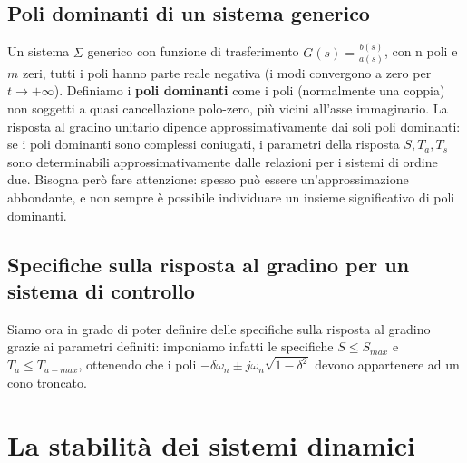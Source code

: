 \documentclass[11pt]{article}
\begin{document}
\subsection{Poli dominanti di un sistema generico}
Un sistema $\Sigma$ generico con funzione di trasferimento $G(s)=\frac{b(s)}{a(s)}$, con n poli e $m$ zeri, tutti i poli hanno parte reale negativa (i modi convergono a zero per $t\rightarrow+\infty$). Definiamo i \textbf{poli dominanti} come i poli (normalmente una coppia) non soggetti a quasi cancellazione polo-zero, più vicini all'asse immaginario. La risposta al gradino unitario dipende approssimativamente dai soli poli dominanti: se i poli dominanti sono complessi coniugati, i parametri della risposta $S, T_a, T_s$ sono determinabili approssimativamente dalle relazioni per i sistemi di ordine due. Bisogna però fare attenzione: spesso può essere un'approssimazione abbondante, e non sempre è possibile individuare un insieme significativo di poli dominanti. 
\subsection{Specifiche sulla risposta al gradino per un sistema di controllo}
Siamo ora in grado di poter definire delle specifiche sulla risposta al gradino grazie ai parametri definiti: imponiamo infatti le specifiche $S \le S_{max}$ e $T_a \le T_{a-max}$, ottenendo che i poli $-\delta\omega_n \pm j\omega_n \sqrt{1-\delta^2}$ devono appartenere ad un cono troncato.

\section{La stabilità dei sistemi dinamici}
\end{document}

